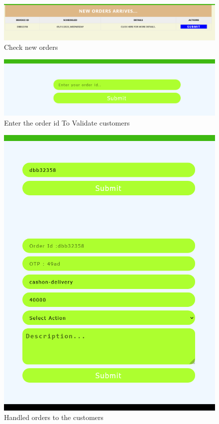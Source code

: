 \begin{figure}[ht]
    \centering  
    \includegraphics[width=\textwidth, height=0.8\textheight, keepaspectratio]{designs/check new orders.png}    
    \caption{Check new orders}
    \label{fig:fig 6.2.32}
\end{figure}
\begin{figure}[ht]
    \centering  
    \includegraphics[width=\textwidth, height=0.8\textheight, keepaspectratio]{designs/customer gets OTP.png}    
    \caption{Enter the order id To Validate customers}
    \label{fig:fig 6.2.33}
\end{figure}
\begin{figure}[ht]
    \centering  
    \includegraphics[width=\textwidth, height=0.8\textheight, keepaspectratio]{designs/orders completations.png}    
    \caption{Handled orders to the customers}
    \label{fig:fig 6.2.34}
\end{figure}
